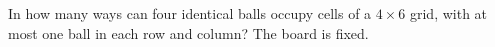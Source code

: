 In how many ways can four identical balls occupy cells of a $4\times6$ grid, with at most one ball in each row and column? The board is fixed.
